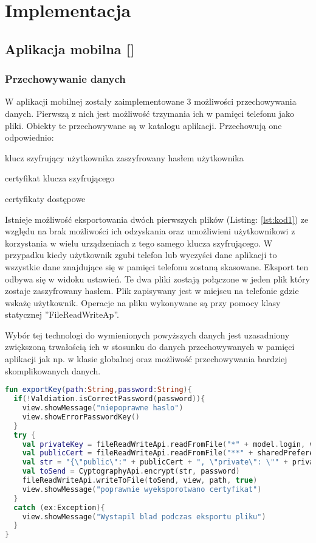 \newpage\section{Implementacja} \label{sec:implementacja}
\subsection[Aplikacja mobilna]{Aplikacja mobilna [\StudentB]}
	\subsubsection{Przechowywanie danych}
	W aplikacji mobilnej zostały zaimplementowane 3 możliwości przechowywania danych. Pierwszą z nich jest możliwość trzymania ich w pamięci telefonu jako pliki. Obiekty te przechowywane są w katalogu aplikacji. Przechowują one odpowiednio:
	\begin{itemize*}
	\item	klucz szyfrujący użytkownika zaszyfrowany hasłem użytkownika
	\item certyfikat klucza szyfrującego 
	\item certyfikaty dostępowe
	\end{itemize*}	
	Istnieje możliwość eksportowania dwóch pierwszych plików (Listing: \ref{lst:kod1}) ze względu na brak możliwości ich odzyskania oraz umożliwieni użytkownikowi z korzystania w wielu urządzeniach z tego samego klucza szyfrującego. W przypadku kiedy użytkownik zgubi telefon lub  wyczyści dane aplikacji to wszystkie dane znajdujące się w pamięci telefonu zostaną skasowane. Eksport ten odbywa się w widoku ustawień. Te dwa pliki zostają połączone w jeden plik który zostaje zaszyfrowany hasłem. Plik zapisywany jest w miejscu na telefonie gdzie wskażę użytkownik.  Operacje na pliku wykonywane są przy pomocy klasy statycznej ''FileReadWriteAp''.
	
	Wybór  tej technologi do wymienionych powyższych danych jest uzasadniony zwiększoną trwałością ich w stosunku do danych przechowywanych w pamięci aplikacji jak np.  w klasie globalnej oraz możliwość przechowywania bardziej skomplikowanych danych.
	
	\begin{lstlisting}[caption={Funkcja eksportująca klucz szyfrujący.}, label={lst:kod1}, language=Kotlin]
fun exportKey(path:String,password:String){
  if(!Valdiation.isCorrectPassword(password)){
    view.showMessage("niepoprawne haslo")
    view.showErrorPasswordKey()
  }
  try {
    val privateKey = fileReadWriteApi.readFromFile("*" + model.login, view)
    val publicCert = fileReadWriteApi.readFromFile("**" + sharedPreferenceApi.getString(view, EnumChoice.login), view)	
    val str = "{\"public\":" + publicCert + ", \"private\": \"" + privateKey + "\"}"
    val toSend = CyptographyApi.encrypt(str, password)
    fileReadWriteApi.writeToFile(toSend, view, path, true)
    view.showMessage("poprawnie wyeksporotwano certyfikat")
  }
  catch (ex:Exception){
    view.showMessage("Wystapil blad podczas eksportu pliku")
  }
}
	\end{lstlisting}	
		
